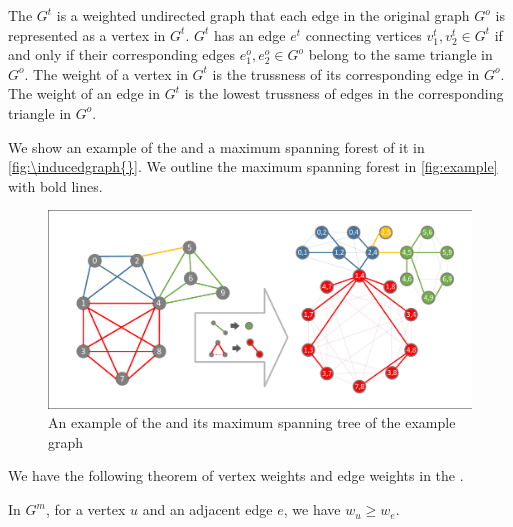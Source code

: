 \begin{Def}[\Inducedgraph{}]
The \inducedgraph{} $G^t$ is a weighted undirected graph that each edge in the original graph $G^o$ is represented as a vertex in $G^t$. $G^t$ has an edge $e^{t}$ connecting vertices $v^{t}_{1}, v^{t}_{2} \in G^{t}$ if and only if their corresponding edges $e^{o}_{1}, e^{o}_{2} \in G^{o}$ belong to the same triangle in $G^o$. The weight of a vertex in $G^{t}$ is the trussness of its corresponding edge in $G^o$. The weight of an edge in $G^{t}$ is the lowest trussness of edges in the corresponding triangle in $G^{o}$. 
\label{def:\inducedgraph{}}
\end{Def}

We show an example of the \inducedgraph{} and a maximum spanning forest of it in \autoref{fig:\inducedgraph{}}. We outline the maximum spanning forest in \autoref{fig:example} with bold lines. %


\begin{figure}[ht]
    \centering
    \includegraphics[width=0.8\linewidth, trim={0.1cm 0.1cm, 0.1cm, 0.1cm}, clip]{./figures/bottom_level.pdf}
    \caption{An example of the \inducedgraph{} and its maximum spanning tree of the example graph}
    \label{fig:\inducedgraph{}}
\end{figure}

We have the following theorem of vertex weights and edge weights in the \inducedgraph{}. 

\begin{Thm}
In \inducedgraph{} $G^m$, for a vertex $u$ and an adjacent edge $e$, we have $w_u \ge w_e$.
\label{thm:\inducedgraph{}_vertex_trussness}
\end{Thm}

